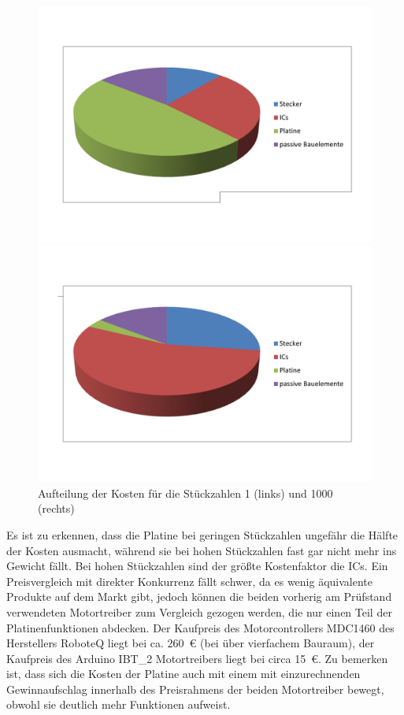 \begin{figure}[H]
\begin{minipage}[h]{0.5\textwidth}
\includegraphics[width=\textwidth]{./Bilder/Platinenkosten.pdf}
\end{minipage}
\begin{minipage}[h]{0.5\textwidth}
\includegraphics[width=\textwidth]{./Bilder/Platinenkosten-tausend.pdf}
\end{minipage}
\caption{Aufteilung der Kosten für die Stückzahlen 1 (links) und 1000 (rechts)}
	\label{fig:LDO}
\end{figure}\noindent
Es ist zu erkennen, dass die Platine bei geringen Stückzahlen ungefähr die Hälfte der Kosten ausmacht, während sie bei hohen Stückzahlen fast gar nicht mehr ins Gewicht fällt. Bei hohen Stückzahlen sind der größte Kostenfaktor die ICs. 
Ein Preisvergleich mit direkter Konkurrenz fällt schwer, da es wenig äquivalente Produkte auf dem Markt gibt, jedoch können die beiden vorherig am Prüfstand verwendeten Motortreiber zum Vergleich gezogen werden, die nur einen Teil der Platinenfunktionen abdecken. Der Kaufpreis des Motorcontrollers MDC1460 des Herstellers RoboteQ liegt bei ca. \SI{260}{\euro} (bei über vierfachem Bauraum), der Kaufpreis des Arduino IBT\_2 Motortreibers liegt bei circa \SI{15}{\euro}. Zu bemerken ist, dass sich die Kosten der Platine auch mit einem mit einzurechnenden Gewinnaufschlag innerhalb des Preisrahmens der beiden Motortreiber bewegt, obwohl sie deutlich mehr Funktionen aufweist.

